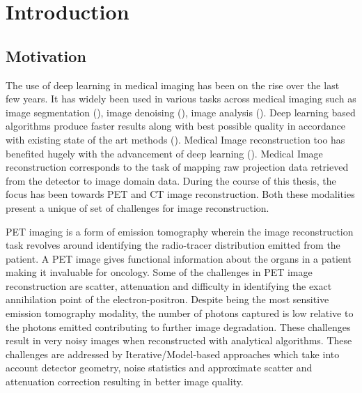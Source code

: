 
\chapter{Introduction} %

\label{Chapter1} %


\section{Motivation}

The use of deep learning in medical imaging has been on the rise over the last few years. It has widely been used in various tasks across medical imaging such as image segmentation  (\cite{ronneberger2015u,guo2019deep,sinha2019multi,dolz2018hyperdense,hatt2018first}), image denoising (\cite{kadimesetty2018convolutional,li2020sacnn,chen2017low,yang2018low}), image analysis (\cite{litjens2017survey,amyar20193,cui2018artificial}). %
Deep learning based algorithms produce faster results along with best possible quality in accordance with existing state of the art methods (\cite{leuschner2021quantitative}). Medical Image reconstruction too has benefited hugely with the advancement of deep learning (\cite{reader2020deep,zhang2020review}).
Medical Image reconstruction corresponds to the task of mapping raw projection data retrieved from the detector to image domain data. During the course of this thesis, the focus has been towards \ac{PET} and \ac{CT} image reconstruction. Both these modalities present a unique of set of challenges for image reconstruction. 
 
\ac{PET} imaging is a form of emission tomography wherein the image reconstruction task revolves around identifying the radio-tracer distribution emitted from the patient. A \ac{PET} image gives functional information about the organs in a patient making it invaluable for oncology. Some of the challenges in \ac{PET} image reconstruction are scatter, attenuation and difficulty in identifying the exact annihilation point of the electron-positron. Despite being the most sensitive emission tomography modality, the number of photons captured is low relative to the photons emitted contributing to further image degradation. These challenges result in very noisy images when reconstructed with analytical algorithms. These challenges are addressed by  Iterative/Model-based approaches which take into account detector geometry, noise statistics and approximate scatter and attenuation correction resulting in better image quality. 

